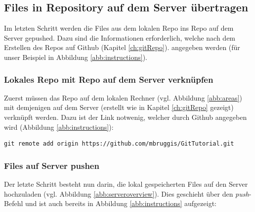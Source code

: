 \documentclass[twoside, 11pr]{article}
\begin{document}
\subsection{Files in Repository auf dem Server übertragen}\label{ch:push}

Im letzten Schritt werden die Files aus dem lokalen Repo ins Repo auf dem Server gepushed. Dazu sind die Informationen erforderlich, welche nach dem Erstellen des Repos auf Github (Kapitel \ref{ch:gitRepo}). angegeben werden (für unser Beispiel in Abbildung \ref{abb:instructions}).

\begin{figure}[!tbph]
\end{figure}

\subsubsection{Lokales Repo mit Repo auf dem Server verknüpfen}

Zuerst müssen das Repo auf dem lokalen Rechner (vgl. Abbildung \ref{abb:areas}) mit demjenigen auf dem Server (erstellt wie in Kapitel \ref{ch:gitRepo} gezeigt) verknüpft werden. Dazu ist der Link notwenig, welcher durch Github angegeben wird (Abbildung \ref{abb:instructions}):

\begin{lstlisting}
git remote add origin https://github.com/mbruggis/GitTutorial.git
\end{lstlisting}

\subsubsection{Files auf Server pushen}
Der letzte Schritt besteht nun darin, die lokal gespeicherten Files auf den Server hochzuladen (vgl. Abbildung \ref{abb:serveroverview}). Dies geschieht über den \textit{push}-Befehl und ist auch bereits in Abbildung \ref{abb:instructions} aufgezeigt:
\end{document}
